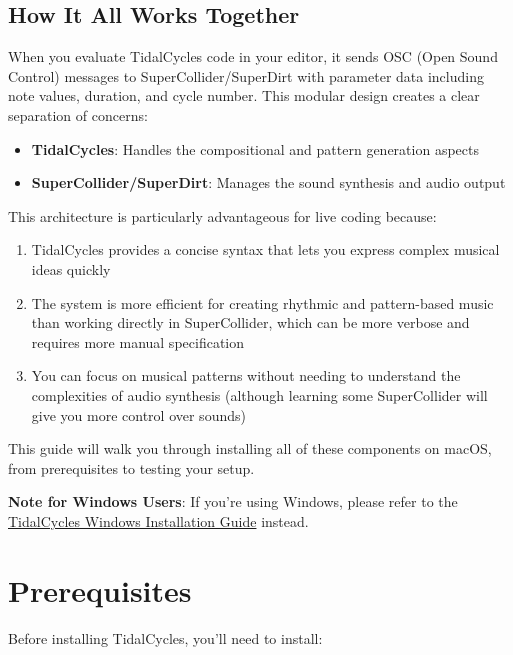 \documentclass[11pt,a4paper]{article}
\begin{document}
\subsection{How It All Works Together}

When you evaluate TidalCycles code in your editor, it sends OSC (Open Sound Control) messages to SuperCollider/SuperDirt with parameter data including note values, duration, and cycle number. This modular design creates a clear separation of concerns:

\begin{itemize}
    \item \textbf{TidalCycles}: Handles the compositional and pattern generation aspects
    \item \textbf{SuperCollider/SuperDirt}: Manages the sound synthesis and audio output
\end{itemize}

This architecture is particularly advantageous for live coding because:

\begin{enumerate}
    \item TidalCycles provides a concise syntax that lets you express complex musical ideas quickly
    \item The system is more efficient for creating rhythmic and pattern-based music than working directly in SuperCollider, which can be more verbose and requires more manual specification
    \item You can focus on musical patterns without needing to understand the complexities of audio synthesis (although learning some SuperCollider will give you more control over sounds)
\end{enumerate}

This guide will walk you through installing all of these components on macOS, from prerequisites to testing your setup.

\begin{notebox}
\textbf{Note for Windows Users}: If you're using Windows, please refer to the \href{https://tidalcycles.org/docs/getting-started/windows_install}{TidalCycles Windows Installation Guide} instead.
\end{notebox}

\section{Prerequisites}

Before installing TidalCycles, you'll need to install:
\end{document}
